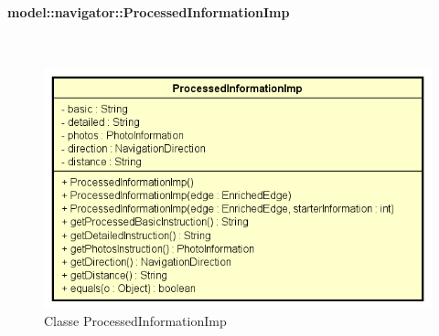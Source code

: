 \documentclass[../DefinizioneDiProdotto.tex]{subfiles}
\begin{document}
\paragraph{model::navigator::ProcessedInformationImp}
\
\begin{figure}[H]
	\centering
	\includegraphics[width=\maxwidth]{img/ProcessedInformationImp.png}
	\caption{Classe ProcessedInformationImp}\label{fig:model::navigator::ProcessedInformationImp} 
\end{figure}
\end{document}
